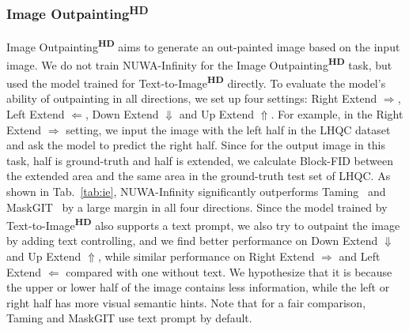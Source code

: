\documentclass{article}
\begin{document}
\subsubsection{Image Outpainting\textsuperscript{\textbf{HD}}}
Image Outpainting\textsuperscript{\textbf{HD}} aims to generate an out-painted image based on the input image. We do not train NUWA-Infinity for the Image Outpainting\textsuperscript{\textbf{HD}} task, but used the model trained for Text-to-Image\textsuperscript{\textbf{HD}} directly. To evaluate the model's ability of outpainting in all directions, we set up four settings: Right Extend $\Rightarrow$, Left Extend $\Leftarrow $, Down Extend $\Downarrow$ and Up Extend $\Uparrow$. For example, in the Right Extend $\Rightarrow$ setting, we input the image with the left half in the LHQC dataset and ask the model to predict the right half. Since for the output image in this task, half is ground-truth and half is extended, we calculate Block-FID between the extended area and the same area in the ground-truth test set of LHQC. As shown in Tab.~\ref{tab:ie}, NUWA-Infinity significantly outperforms Taming~\cite{esserTamingTransformersHighResolution2021} and MaskGIT~\cite{changMaskGITMaskedGenerative2022} by a large margin in all four directions. Since the model trained by Text-to-Image\textsuperscript{\textbf{HD}} also supports a text prompt, we also try to outpaint the image by adding text controlling, and we find better performance on Down Extend $\Downarrow$ and Up Extend $\Uparrow$, while similar performance on Right Extend $\Rightarrow$ and Left Extend $\Leftarrow $ compared with one without text. We hypothesize that it is because the upper or lower half of the image contains less information, while the left or right half has more visual semantic hints. Note that for a fair comparison, Taming and MaskGIT use text prompt by default.
\end{document}
